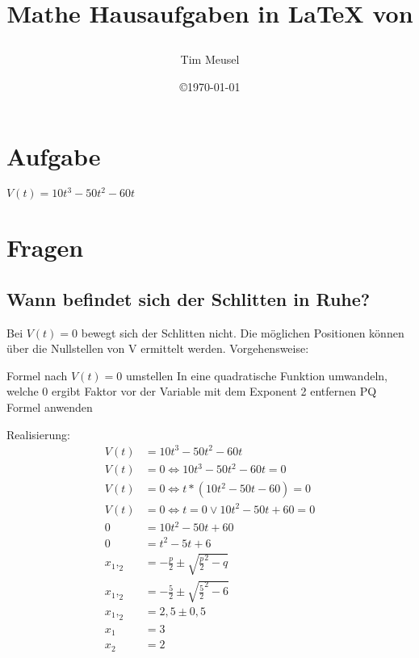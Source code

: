 \documentclass[a4paper,11pt]{scrartcl}
\author{Tim Meusel}
\title{Mathe Hausaufgaben in \LaTeX{} von \author{}}
\date{\copyright\today}
\begin{document}
\maketitle

\section{Aufgabe}

$V(t) = 10t^3 - 50t^2 - 60t$

\section{Fragen}

\subsection{Wann befindet sich der Schlitten in Ruhe?}
Bei $V(t) = 0$ bewegt sich der Schlitten nicht. Die möglichen Positionen können
über die Nullstellen von V ermittelt werden. Vorgehensweise:

\begin{outline}
  \1 Formel nach $V(t) = 0$ umstellen
  \1 In eine quadratische Funktion umwandeln, welche 0 ergibt
  \1 Faktor vor der Variable mit dem Exponent 2 entfernen
  \1 PQ Formel anwenden
\end{outline}

Realisierung:
\begin{align*}
  V(t) &= 10t^3 - 50t^2 - 60t                               \\
  V(t) &= 0 \Leftrightarrow 10t^3 - 50t^2 - 60t = 0         \\
  V(t) &= 0 \Leftrightarrow t * (10t^2 - 50t - 60) = 0      \\
  V(t) &= 0 \Leftrightarrow t = 0 \vee 10t^2 - 50t + 60 = 0 \\
     0 &= 10t^2 - 50t + 60                                  \\
     0 &= t^2 - 5t + 6                                      \\
 x_1,_2 &= -\frac{p}{2} \pm \sqrt{\frac{p}{2}^2 - q}        \\
 x_1,_2 &= -\frac{5}{2} \pm \sqrt{\frac{5}{2}^2 - 6}        \\
 x_1,_2 &= 2,5 \pm 0,5                                      \\
 x_1    &= 3                                                \\
 x_2    &= 2                                                \\
\end{align*}
\end{document}

